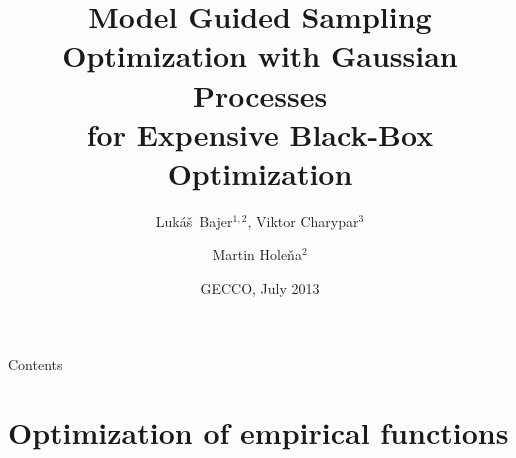 \documentclass[sans,mathserif]{beamer}
\title[MGSO with Gaussian Processes for Black-Box Opt.
  \hspace{4em}\insertframenumber] %
  {Model Guided Sampling Optimization with Gaussian Processes \\ for Expensive Black-Box Optimization}
\author[Luk\'{a}\v{s} Bajer, Viktor Charypar, Martin Hole\v{n}a]
{Luk\'{a}\v{s}~Bajer$^{1,2}$, Viktor Charypar$^3$ \and Martin Hole\v{n}a$^2$}
\institute[MFF UK, UI AVČR, FJFI ČVUT] %
{
  $^1$Faculty of Mathematics and Physics, Charles University, and \\
  $^2$Institute of Computer Science, Czech Academy of Sciences \\
  $^3$Faculty of Nuclear Sciences, Czech Technical University
\vskip 1em
  Prague, Czech Republic
}
\date{GECCO, July 2013}
\begin{document}
\begin{frame}
  \titlepage
\end{frame}

\begin{frame}{Contents}
  \tableofcontents
\end{frame}





\section{Optimization of empirical functions}
\end{document}
